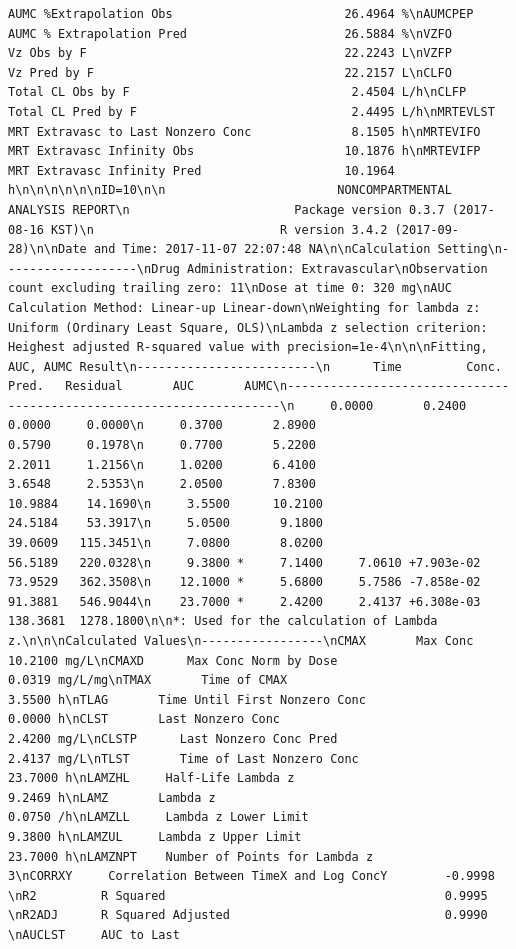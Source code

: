 \documentclass[12pt,]{krantz}
\theoremstyle{definition}
\theoremstyle{definition}
\theoremstyle{definition}
\theoremstyle{remark}
\begin{document}
\begin{verbatim}
AUMC %Extrapolation Obs                        26.4964 %\nAUMCPEP    AUMC % Extrapolation Pred                      26.5884 %\nVZFO       Vz Obs by F                                    22.2243 L\nVZFP       Vz Pred by F                                   22.2157 L\nCLFO       Total CL Obs by F                               2.4504 L/h\nCLFP       Total CL Pred by F                              2.4495 L/h\nMRTEVLST   MRT Extravasc to Last Nonzero Conc              8.1505 h\nMRTEVIFO   MRT Extravasc Infinity Obs                     10.1876 h\nMRTEVIFP   MRT Extravasc Infinity Pred                    10.1964 h\n\n\n\n\n\nID=10\n\n                        NONCOMPARTMENTAL ANALYSIS REPORT\n                       Package version 0.3.7 (2017-08-16 KST)\n                          R version 3.4.2 (2017-09-28)\n\nDate and Time: 2017-11-07 22:07:48 NA\n\nCalculation Setting\n-------------------\nDrug Administration: Extravascular\nObservation count excluding trailing zero: 11\nDose at time 0: 320 mg\nAUC Calculation Method: Linear-up Linear-down\nWeighting for lambda z: Uniform (Ordinary Least Square, OLS)\nLambda z selection criterion: Heighest adjusted R-squared value with precision=1e-4\n\n\nFitting, AUC, AUMC Result\n-------------------------\n      Time         Conc.      Pred.   Residual       AUC       AUMC\n---------------------------------------------------------------------\n     0.0000       0.2400                           0.0000     0.0000\n     0.3700       2.8900                           0.5790     0.1978\n     0.7700       5.2200                           2.2011     1.2156\n     1.0200       6.4100                           3.6548     2.5353\n     2.0500       7.8300                          10.9884    14.1690\n     3.5500      10.2100                          24.5184    53.3917\n     5.0500       9.1800                          39.0609   115.3451\n     7.0800       8.0200                          56.5189   220.0328\n     9.3800 *     7.1400     7.0610 +7.903e-02    73.9529   362.3508\n    12.1000 *     5.6800     5.7586 -7.858e-02    91.3881   546.9044\n    23.7000 *     2.4200     2.4137 +6.308e-03   138.3681  1278.1800\n\n*: Used for the calculation of Lambda z.\n\n\nCalculated Values\n-----------------\nCMAX       Max Conc                                       10.2100 mg/L\nCMAXD      Max Conc Norm by Dose                           0.0319 mg/L/mg\nTMAX       Time of CMAX                                    3.5500 h\nTLAG       Time Until First Nonzero Conc                   0.0000 h\nCLST       Last Nonzero Conc                               2.4200 mg/L\nCLSTP      Last Nonzero Conc Pred                          2.4137 mg/L\nTLST       Time of Last Nonzero Conc                      23.7000 h\nLAMZHL     Half-Life Lambda z                              9.2469 h\nLAMZ       Lambda z                                        0.0750 /h\nLAMZLL     Lambda z Lower Limit                            9.3800 h\nLAMZUL     Lambda z Upper Limit                           23.7000 h\nLAMZNPT    Number of Points for Lambda z                   3\nCORRXY     Correlation Between TimeX and Log ConcY        -0.9998 \nR2         R Squared                                       0.9995 \nR2ADJ      R Squared Adjusted                              0.9990 \nAUCLST     AUC to Last 
\end{verbatim}
\end{document}
